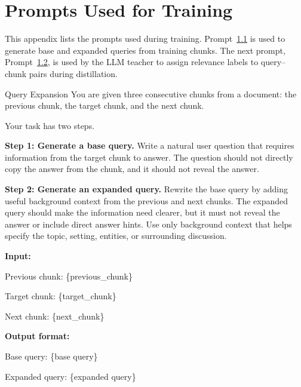 \documentclass{llmxive}
\begin{document}







\appendix

\section{Prompts Used for Training}
\label{app:training_prompts}

This appendix lists the prompts used during training.  
Prompt~\hyperref[app:training_prompts]{\ref*{app:training_prompts}.1} is used to generate base and expanded queries from training chunks. 
The next prompt, Prompt~\hyperref[app:training_prompts]{\ref*{app:training_prompts}.2}, is used by the LLM teacher to assign relevance labels to query--chunk pairs during distillation.

\begin{promptbox}{Query Expansion}
\label{box:query_generation_prompt}
You are given three consecutive chunks from a document: the previous chunk, the target chunk, and the next chunk.

Your task has two steps.

\textbf{Step 1: Generate a base query.}  
Write a natural user question that requires information from the target chunk to answer. The question should not directly copy the answer from the chunk, and it should not reveal the answer.

\textbf{Step 2: Generate an expanded query.}  
Rewrite the base query by adding useful background context from the previous and next chunks. The expanded query should make the information need clearer, but it must not reveal the answer or include direct answer hints. Use only background context that helps specify the topic, setting, entities, or surrounding discussion.

\textbf{Input:}

Previous chunk: \{previous\_chunk\}

Target chunk: \{target\_chunk\}

Next chunk: \{next\_chunk\}

\textbf{Output format:}

Base query: \{base query\}

Expanded query: \{expanded query\}
\end{promptbox}
\end{document}
